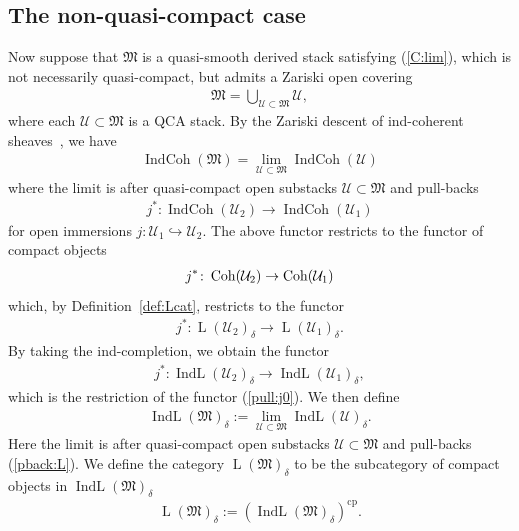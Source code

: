 \documentclass [11pt,oneside,a4paper,mathscr]{amsart}
\theoremstyle{definition}
\newcommand{\LL}{\operatorname{L}}
\newcommand{\Coh}{\operatorname{Coh}}
\newcommand{\IndCoh}{\operatorname{IndCoh}}
\newcommand{\IndL}{\operatorname{IndL}}
\begin{document}
\subsection{The non-quasi-compact case}\label{subsec:nonqcp}
Now suppose that $\mathfrak{M}$ is a quasi-smooth derived stack satisfying (\ref{C:lim}), which is 
not necessarily quasi-compact, but admits a Zariski open covering 
\begin{align*}
    \mathfrak{M}=\bigcup_{\mathcal{U}\subset \mathfrak{M}}\mathcal{U},
\end{align*}
where each $\mathcal{U}\subset \mathfrak{M}$ is a QCA stack. 
By the Zariski descent of ind-coherent sheaves~\cite[Proposition~4.2.1]{MR3136100}, 
we have 
\begin{align*}
    \IndCoh(\mathfrak{M})=\lim_{\mathcal{U}\subset \mathfrak{M}}\IndCoh(\mathcal{U})
\end{align*}
where the limit is after quasi-compact open substacks $\mathcal{U}\subset \mathfrak{M}$ 
and pull-backs
\begin{align}\label{pull:j0}
j^{*}\colon 
    \IndCoh(\mathcal{U}_2) \to \IndCoh(\mathcal{U}_1)
\end{align}
for open immersions $j \colon \mathcal{U}_1 \hookrightarrow \mathcal{U}_2$. 
The above functor restricts to the functor of compact objects
\begin{align}\notag
    j^* \colon \Coh(\mathcal{U}_2) \to \Coh(\mathcal{U}_1)
\end{align}
which, by Definition~\ref{def:Lcat}, 
restricts to the functor 
\begin{align}\label{pback:L0}
    j^* \colon \LL(\mathcal{U}_2)_{\delta}\to \LL(\mathcal{U}_1)_{\delta}. 
\end{align}
By taking the ind-completion, we obtain the functor 
\begin{align}\label{pback:L}
    j^* \colon \IndL(\mathcal{U}_2)_{\delta} \to \IndL(\mathcal{U}_1)_{\delta},
\end{align}
which is the restriction of the functor (\ref{pull:j0}). 
We then define 
\begin{align}\label{def:Ltilde0}
    \IndL(\mathfrak{M})_{\delta}:=\lim_{\mathcal{U}\subset \mathfrak{M}}\IndL(\mathcal{U})_{\delta}. 
\end{align}
Here the limit is after quasi-compact open substacks $\mathcal{U}\subset \mathfrak{M}$ and 
pull-backs (\ref{pback:L}). 
We define the category $\LL(\mathfrak{M})_{\delta}$ to be 
the subcategory of compact objects in $\IndL(\mathfrak{M})_{\delta}$
\begin{align*}
    \LL(\mathfrak{M})_{\delta}:=(\IndL(\mathfrak{M})_{\delta})^{\mathrm{cp}}. 
\end{align*}
\end{document}
